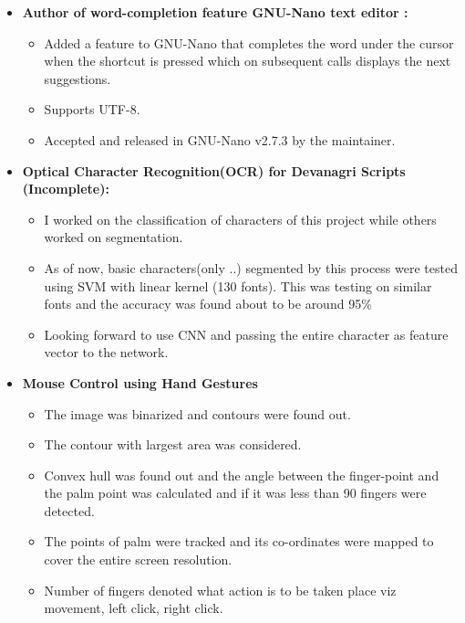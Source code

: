 \documentclass[11pt,a4paper,sans]{moderncv}        %
\begin{document}
\begin{itemize}

\item{\textbf{Author of word-completion feature GNU-Nano text editor :}%

\vspace{3pt}

		\small{\begin{itemize}

			\item Added a feature to GNU-Nano that completes the word under the cursor when the shortcut  is pressed which
		on subsequent calls displays the next suggestions.
			\item Supports UTF-8.
		 	\item Accepted and released in GNU-Nano v2.7.3 by the maintainer.
			\end{itemize}
		}}

		\vspace{6pt}

\item{\textbf{Optical Character Recognition(OCR) for Devanagri Scripts (Incomplete):}

\vspace{3pt}

		\small{
			\begin{itemize}
			\item I worked on the classification of characters of this project while others worked on segmentation.
			\item As of now, basic characters(only %
				..) segmented by this process were tested using SVM with linear kernel
				(130 fonts). This was testing on similar fonts and the accuracy was found about to be around 95\%
			\item Looking forward to use CNN and passing the entire character as feature vector to the network.
			\end{itemize}
			}}	

		\vspace{6pt}

\item{\textbf{Mouse Control using Hand Gestures}

\vspace{3pt}

		\small{
			\begin{itemize}
					\item The image was binarized and contours were found out.
					\item The contour with largest area was considered.
					\item  Convex hull was found out and the angle between the
					finger-point and the palm point was calculated and if it
				was less than 90\degree{} fingers were detected.  \item The
					points of palm were tracked and its co-ordinates were
					mapped to cover the entire screen resolution.
					\item Number of fingers denoted what action is to be taken place viz movement, left click, right click.
			\end{itemize}
			}}
		\vspace{6pt}


\end{itemize}
\end{document}

